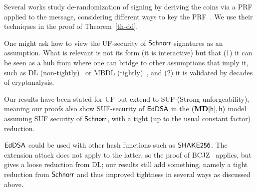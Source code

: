 Several works study de-randomization of signing by deriving the coins via a PRF applied to the message, considering different ways to key the PRF~\cite{C:Goldreich86a,SAC:MNPV98,AC:BelPoeSte16,EC:BelTac16}. We use their techniques in the proof of Theorem~\ref{th-dd}.

One might ask how to view the UF-security of $\mathsf{Schnorr}$ signatures as an assumption. What is relevant is not its form (it is interactive) but that (1) it can be seen as a hub from where one can bridge to other assumptions that imply it, such as DL (non-tightly)~\cite{JC:PoiSte00,EC:AABN02} or MBDL (tightly)~\cite{INDOCRYPT:BelDai20}, and (2) it is validated by decades of cryptanalysis.

Our results have been stated for UF but extend to SUF (Strong unforgeability), meaning our proofs also show SUF-security of $\mathsf{EdDSA}$ in the $(\mathbf{MD}[\mathsf{h}],\mathsf{h})$ model assuming SUF security of $\mathsf{Schnorr}$, with a tight (up to the usual constant factor) reduction.

$\mathsf{EdDSA}$ could be used with other hash functions such as $\mathsf{SHAKE256}$. The extension attack does not apply to the latter, so the proof of BCJZ~\cite{SP:BCJZ21} applies, but gives a loose reduction from DL; our results still add something, namely a tight reduction from $\mathsf{Schnorr}$ and thus improved tightness in several ways as discussed above.










